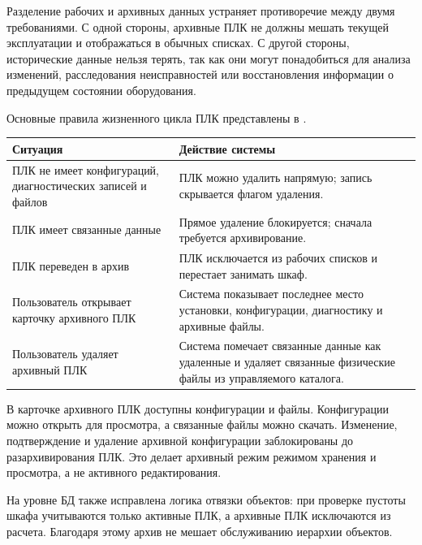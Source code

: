 Разделение рабочих и архивных данных устраняет противоречие между двумя требованиями. С одной стороны, архивные ПЛК не должны мешать текущей эксплуатации и отображаться в обычных списках. С другой стороны, исторические данные нельзя терять, так как они могут понадобиться для анализа изменений, расследования неисправностей или восстановления информации о предыдущем состоянии оборудования.

Основные правила жизненного цикла ПЛК представлены в .

\clearpage

\begin{center}
    \small
    \label{tab:chapter3_controller_lifecycle}
    \begin{tabularx}{\textwidth}{|>{\raggedright\arraybackslash}p{}|>{\raggedright\arraybackslash}X|}
        \hline
        \textbf{Ситуация} & \textbf{Действие системы} \\ \hline
        ПЛК не имеет конфигураций, диагностических записей и файлов & ПЛК можно удалить напрямую; запись скрывается флагом удаления. \\ \hline
        ПЛК имеет связанные данные & Прямое удаление блокируется; сначала требуется архивирование. \\ \hline
        ПЛК переведен в архив & ПЛК исключается из рабочих списков и перестает занимать шкаф. \\ \hline
        Пользователь открывает карточку архивного ПЛК & Система показывает последнее место установки, конфигурации, диагностику и архивные файлы. \\ \hline
        Пользователь удаляет архивный ПЛК & Система помечает связанные данные как удаленные и удаляет связанные физические файлы из управляемого каталога. \\ \hline
    \end{tabularx}
    \normalsize
\end{center}

В карточке архивного ПЛК доступны конфигурации и файлы. Конфигурации можно открыть для просмотра, а связанные файлы можно скачать. Изменение, подтверждение и удаление архивной конфигурации заблокированы до разархивирования ПЛК. Это делает архивный режим режимом хранения и просмотра, а не активного редактирования.

На уровне БД также исправлена логика отвязки объектов: при проверке пустоты шкафа учитываются только активные ПЛК, а архивные ПЛК исключаются из расчета. Благодаря этому архив не мешает обслуживанию иерархии объектов.


